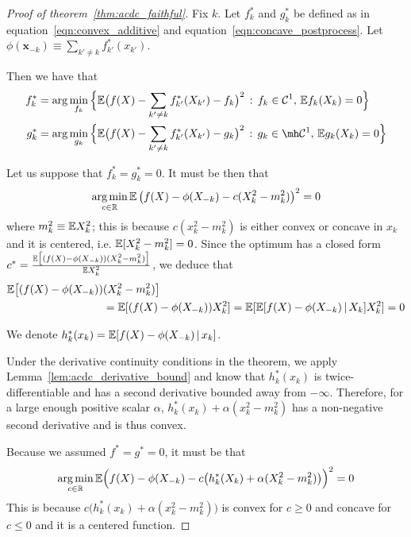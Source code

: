 \begin{proof}[Proof of theorem~\ref{thm:acdc_faithful}]

Fix $k$. Let $f^*_k$ and $g^*_k$ be defined as in
equation~\ref{eqn:convex_additive} and
equation~\ref{eqn:concave_postprocess}. Let $\phi(\mathbf{x}_{-k}) \equiv \sum_{k' \neq k} f^*_{k'}(x_{k'})$.

Then we have that
\begin{align}
f^*_k &= \arg\min_{f_k} \Big\{
   \E\big( f(X) - \sum_{k' \neq k} f^*_{k'}(X_{k'}) - f_k \big)^2 
    \,:\, f_k \in  \mathcal{C}^1,\, \E f_k(X_k) = 0 
  \Big\} \\
g^*_k &= \arg\min_{g_k} \Big\{
   \E\big( f(X) - \sum_{k' \neq k} f^*_{k'}(X_{k'}) - g_k \big)^2 
    \,:\, g_k \in \mh \mathcal{C}^1,\, \E g_k(X_k) = 0 
  \Big\}
\end{align}

Let us suppose that $f^*_k = g^*_k = 0$. It must be then that
\begin{align*}
\mathop{\text{\rm arg\,min}}_{c \in {\mathbb R}} {\mathbb E} \left( f(X) - \phi(X_{-k}) - c (X_k^2 - m_k^2) \right)^2 = 0
\end{align*}
where $m_k^2 \equiv {\mathbb E} X_k^2$; this is because $c(x_k^2 - m_k^2)$ is either convex or concave in $x_k$ and it is centered, i.e. ${\mathbb E}[ X_k^2 - m_k^2] = 0$. Since the optimum has a closed form $c^* = \frac{{\mathbb E}\big[(f(X) -\phi(X_{-k}))(X_k^2 - m^2_k)\big]}{{\mathbb E} X_k^2}$, we deduce that 
\begin{align*}
{\mathbb E} \big[ (f(X) - \phi(X_{-k})) &(X_k^2 - m_k^2) \big] \\
   &= {\mathbb E}[ (f(X) - \phi(X_{-k})) X^2_k] = 
 {\mathbb E}[ {\mathbb E}[ f(X) - \phi(X_{-k}) {\,|\,} X_k] X^2_k] = 0
\end{align*}

We denote $h^*_k(x_k) = {\mathbb E}[ f(X) - \phi(X_{-k}) {\,|\,} x_k]$.

Under the derivative continuity conditions in the theorem, we apply Lemma~\ref{lem:acdc_derivative_bound} and know that $h^*_k(x_k)$ is twice-differentiable and has a second derivative bounded away from $-\infty$. Therefore, for a large enough positive scalar $\alpha$, $h^*_k(x_k) + \alpha(x_k^2 - m_k^2)$ has a non-negative second derivative and is thus convex.

Because we assumed $f^* = g^* = 0$, it must be that
\[
\mathop{\text{\rm arg\,min}}_{c \in {\mathbb R}} 
{\mathbb E}\Big( f(X) - \phi(X_{-k}) - c\big( h^*_k(X_k) + \alpha(X_k^2 - m_k^2)\big) \Big)^2 = 0
\]
This is because $c\big( h^*_k(x_k) + \alpha(x_k^2 - m_k^2) \big)$ is convex for $c \geq 0$ and concave for $c \leq 0$ and it is a centered function.


\end{proof}
